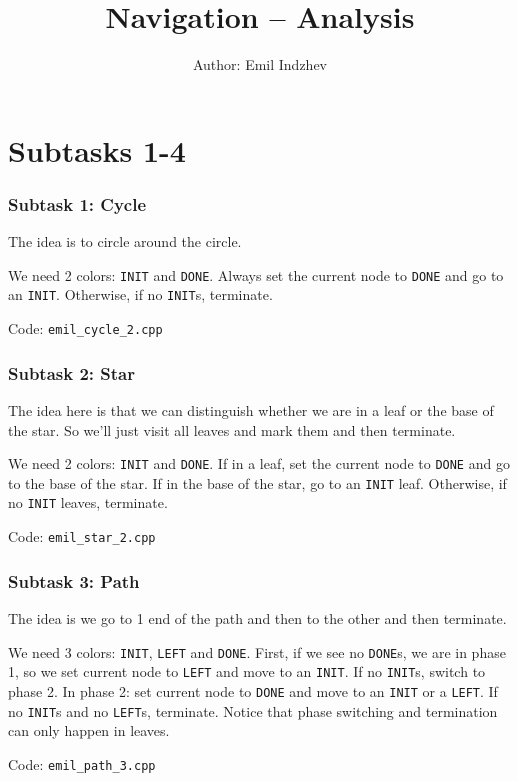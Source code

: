 \documentclass{article}
\title{Navigation -- Analysis}
\author{Author: Emil Indzhev}
\date{}
\begin{document}
\maketitle

\part{Subtasks 1-4}

\section{Subtask 1: Cycle}

The idea is to circle around the circle.

We need 2 colors: \verb|INIT| and \verb|DONE|.
Always set the current node to \verb|DONE| and go to an \verb|INIT|. Otherwise, if no \verb|INIT|s, terminate.

Code: \verb|emil_cycle_2.cpp|

\section{Subtask 2: Star}

The idea here is that we can distinguish whether we are in a leaf or the base of the star. So we'll just visit all leaves and mark them and then terminate.

We need 2 colors: \verb|INIT| and \verb|DONE|.
If in a leaf, set the current node to \verb|DONE| and go to the base of the star. If in the base of the star, go to an \verb|INIT| leaf. Otherwise, if no \verb|INIT| leaves, terminate.

Code: \verb|emil_star_2.cpp|

\section{Subtask 3: Path}

The idea is we go to 1 end of the path and then to the other and then terminate.

We need 3 colors: \verb|INIT|, \verb|LEFT| and \verb|DONE|.
First, if we see no \verb|DONE|s, we are in phase 1, so we set current node to \verb|LEFT| and move to an \verb|INIT|. If no \verb|INIT|s, switch to phase 2. In phase 2: set current node to \verb|DONE| and move to an \verb|INIT| or a \verb|LEFT|. If no \verb|INIT|s and no \verb|LEFT|s, terminate. Notice that phase switching and termination can only happen in leaves.

Code: \verb|emil_path_3.cpp|
\end{document}
